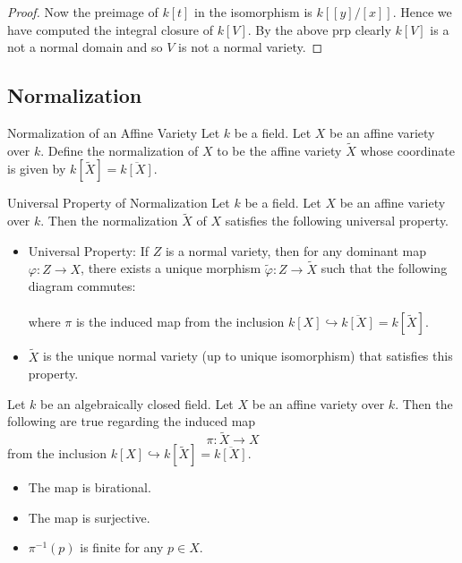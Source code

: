 \documentclass[a4paper]{article}
\begin{document}
\begin{eg}{}{}
\begin{proof}
Now the preimage of $k[t]$ in the isomorphism is $k[[y]/[x]]$. Hence we have computed the integral closure of $k[V]$. By the above prp clearly $k[V]$ is a not a normal domain and so $V$ is not a normal variety. 
\end{proof}
\end{eg}

\subsection{Normalization}
\begin{defn}{Normalization of an Affine Variety}{} Let $k$ be a field. Let $X$ be an affine variety over $k$. Define the normalization of $X$ to be the affine variety $\widetilde{X}$ whose coordinate is given by $k[\widetilde{X}]=\overline{k[X]}$. 
\end{defn}

\begin{prp}{Universal Property of Normalization}{} Let $k$ be a field. Let $X$ be an affine variety over $k$. Then the normalization $\widetilde{X}$ of $X$ satisfies the following universal property. 
\begin{itemize}
\item Universal Property: If $Z$ is a normal variety, then for any dominant map $\varphi:Z\to X$, there exists a unique morphism $\widetilde{\varphi}:Z\to\widetilde{X}$ such that the following diagram commutes: \\
\\
where $\pi$ is the induced map from the inclusion $k[X]\hookrightarrow\overline{k[X]}=k[\widetilde{X}]$. 
\item $\widetilde{X}$ is the unique normal variety (up to unique isomorphism) that satisfies this property. 
\end{itemize}
\end{prp}

\begin{prp}{}{} Let $k$ be an algebraically closed field. Let $X$ be an affine variety over $k$. Then the following are true regarding the induced map $$\pi:\widetilde{X}\to X$$ from the inclusion $k[X]\hookrightarrow k[\widetilde{X}]=\overline{k[X]}$. 
\begin{itemize}
\item The map is birational. 
\item The map is surjective. 
\item $\pi^{-1}(p)$ is finite for any $p\in X$. 
\end{itemize}
\end{prp}
\end{document}
